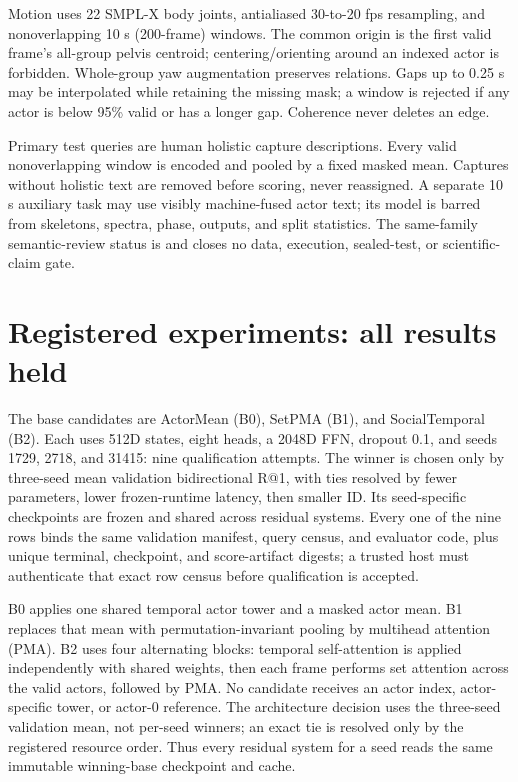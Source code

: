 \documentclass{article}
\begin{document}
Motion uses 22 SMPL-X body joints, antialiased 30-to-20 fps resampling, and
nonoverlapping 10 s (200-frame) windows. The common origin is the first valid
frame's all-group pelvis centroid; centering/orienting around an indexed actor
is forbidden. Whole-group yaw augmentation preserves relations. Gaps up to
0.25 s may be interpolated while retaining the missing mask; a window is
rejected if any actor is below 95\% valid or has a longer gap. Coherence never
deletes an edge.

Primary test queries are human holistic capture descriptions. Every valid
nonoverlapping window is encoded and pooled by a fixed masked mean. Captures
without holistic text are removed before scoring, never reassigned. A separate
10 s auxiliary task may use visibly machine-fused actor text; its model is
barred from skeletons, spectra, phase, outputs, and split statistics. The
same-family semantic-review status is
 and closes no
data, execution, sealed-test, or scientific-claim gate.

\section{Registered experiments: all results held}
The base candidates are ActorMean (B0), SetPMA (B1), and SocialTemporal (B2).
Each uses 512D states, eight heads, a 2048D FFN, dropout 0.1, and seeds 1729,
2718, and 31415: nine qualification attempts. The winner is chosen only by
three-seed mean validation bidirectional R@1, with ties resolved by fewer
parameters, lower frozen-runtime latency, then smaller ID. Its seed-specific
checkpoints are frozen and shared across residual systems. Every one of the
nine rows binds the same validation manifest, query census, and evaluator code,
plus unique terminal, checkpoint, and score-artifact digests; a trusted host
must authenticate that exact row census before qualification is accepted.

B0 applies one shared temporal actor tower and a masked actor mean. B1 replaces
that mean with permutation-invariant pooling by multihead attention (PMA). B2
uses four alternating blocks: temporal self-attention is applied independently
with shared weights, then each frame performs set attention across the valid
actors, followed by PMA. No candidate receives an actor index, actor-specific
tower, or actor-0 reference. The architecture decision uses the three-seed
validation mean, not per-seed winners; an exact tie is resolved only by the
registered resource order. Thus every residual system for a seed reads the
same immutable winning-base checkpoint and cache.
\end{document}
